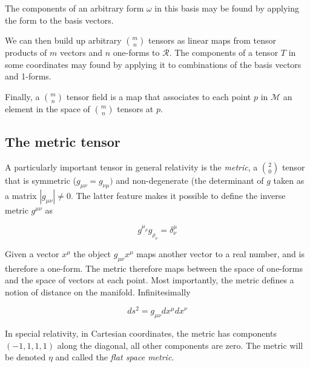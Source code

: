 The components of an arbitrary form $\omega$ in this basis may be
found by applying the form to the basis vectors.

We can then build up arbitrary ${m \choose n}$ tensors as linear maps
from tensor products of $m$ vectors and $n$ one-forms to
$\mathcal{R}$.  The components of a tensor $T$ in some coordinates may
found by applying it to combinations of the basis vectors and 1-forms.


Finally, a ${m \choose n}$ tensor field is a map that associates to
each point $p$ in $\mathcal{M}$ an element in the space of  ${m
\choose n}$ tensors at $p$.

\subsection{The metric tensor}

A particularly important tensor in general relativity is the
\emph{metric}, a ${2 \choose 0}$ tensor that is symmetric ($g_{\mu\nu}
= g_{\nu\mu})$ and non-degenerate (the determinant of $g$ taken as a
matrix $|g_{\mu\nu}| \neq 0$.  The latter feature makes it possible to
define the inverse metric $g^{\mu\nu}$ as

\begin{equation*}
g^{\mu_\rho} g_{\rho_\nu} = \delta^\mu_\nu
\end{equation*}

Given a vector $x^\mu$ the object $g_{\mu\nu} x^\mu$ maps another
vector to a real number, and is therefore a one-form.  The metric
therefore maps between the space of one-forms and the space of vectors
at each point.  Most importantly, the metric defines a notion of
distance on the manifold.  Infinitesimally

\begin{equation}
ds^2 = g_{\mu\nu} dx^\mu dx^\nu
\end{equation}

In special relativity, in Cartesian coordinates, the metric has
components $(-1,1,1,1)$ along the diagonal, all other components are
zero.   The metric will be denoted $\eta$ and called the \emph{flat
space metric}.

